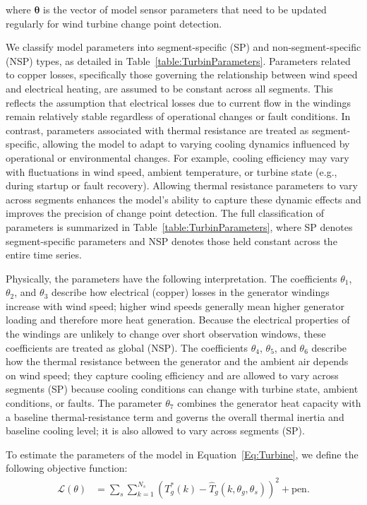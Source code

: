 \documentclass[10pt,letterpaper]{article}
\begin{document}
where \(\boldsymbol{\theta}\) is the vector of model sensor parameters that need to be updated regularly for wind turbine change point detection. 

We classify model parameters into segment-specific (SP) and non-segment-specific (NSP) types, as detailed in Table~\ref{table:TurbinParameters}. Parameters related to copper losses, specifically those governing the relationship between wind speed and electrical heating, are assumed to be constant across all segments. This reflects the assumption that electrical losses due to current flow in the windings remain relatively stable regardless of operational changes or fault conditions. In contrast, parameters associated with thermal resistance are treated as segment-specific, allowing the model to adapt to varying cooling dynamics influenced by operational or environmental changes. For example, cooling efficiency may vary with fluctuations in wind speed, ambient temperature, or turbine state (e.g., during startup or fault recovery). Allowing thermal resistance parameters to vary across segments enhances the model’s ability to capture these dynamic effects and improves the precision of change point detection. The full classification of parameters is summarized in Table~\ref{table:TurbinParameters}, where SP denotes segment-specific parameters and NSP denotes those held constant across the entire time series.

Physically, the parameters have the following interpretation. The coefficients $\theta_1$, $\theta_2$, and $\theta_3$ describe how electrical (copper) losses in the generator windings increase with wind speed; higher wind speeds generally mean higher generator loading and therefore more heat generation. Because the electrical properties of the windings are unlikely to change over short observation windows, these coefficients are treated as global (NSP). The coefficients $\theta_4$, $\theta_5$, and $\theta_6$ describe how the thermal resistance between the generator and the ambient air depends on wind speed; they capture cooling efficiency and are allowed to vary across segments (SP) because cooling conditions can change with turbine state, ambient conditions, or faults. The parameter $\theta_7$ combines the generator heat capacity with a baseline thermal-resistance term and governs the overall thermal inertia and baseline cooling level; it is also allowed to vary across segments (SP).

To estimate the parameters of the model in
Equation~\ref{Eq:Turbine}, we define the following objective function:
\begin{align}
\mathcal{L}(\theta)
&=
\sum_{s}
\sum_{k=1}^{N_s}
\left(
T_g^*(k)
-
\hat{T}_g(k,\theta_g,\theta_s)
\right)^2
+
\mathrm{pen}.
\end{align}
\end{document}
